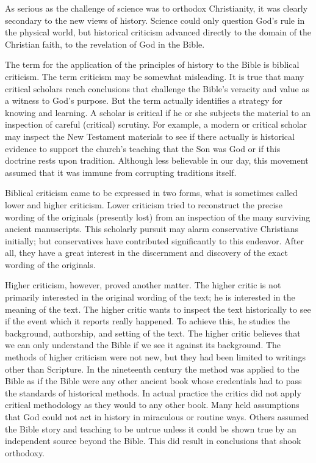 As serious as the challenge of science was to orthodox Christianity, it was clearly secondary to the
new views of history. Science could only question God’s rule in the physical world, but historical
criticism advanced directly to the domain of the Christian faith, to the revelation of God in the
Bible.

The term for the application of the principles of history to the Bible is biblical criticism. The
term criticism may be somewhat misleading. It is true that many critical scholars reach conclusions
that challenge the Bible’s veracity and value as a witness to God’s purpose. But the term actually
identifies a strategy for knowing and learning. A scholar is critical if he or she subjects the
material to an inspection of careful (critical) scrutiny. For example, a modern or critical scholar
may inspect the New Testament materials to see if there actually is historical evidence to support
the church’s teaching that the Son was God or if this doctrine rests upon tradition. Although less
believable in our day, this movement assumed that it was immune from corrupting traditions itself.

Biblical criticism came to be expressed in two forms, what is sometimes called lower and higher
criticism. Lower criticism tried to reconstruct the precise wording of the originals (presently
lost) from an inspection of the many surviving ancient manuscripts. This scholarly pursuit may alarm
conservative Christians initially; but conservatives have contributed significantly to this
endeavor. After all, they have a great interest in the discernment and discovery of the exact
wording of the originals.

Higher criticism, however, proved another matter. The higher critic is not primarily interested in
the original wording of the text; he is interested in the meaning of the text. The higher critic
wants to inspect the text historically to see if the event which it reports really happened. To
achieve this, he studies the background, authorship, and setting of the text. The higher critic
believes that we can only understand the Bible if we see it against its background. The methods of
higher criticism were not new, but they had been limited to writings other than Scripture. In the
nineteenth century the method was applied to the Bible as if the Bible were any other ancient book
whose credentials had to pass the standards of historical methods. In actual practice the critics
did not apply critical methodology as they would to any other book. Many held assumptions that God
could not act in history in miraculous or routine ways. Others assumed the Bible story and teaching
to be untrue unless it could be shown true by an independent source beyond the Bible. This did
result in conclusions that shook orthodoxy.

